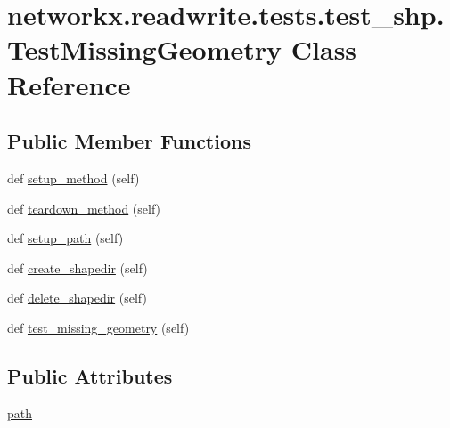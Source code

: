 \hypertarget{classnetworkx_1_1readwrite_1_1tests_1_1test__shp_1_1TestMissingGeometry}{}\section{networkx.\+readwrite.\+tests.\+test\+\_\+shp.\+Test\+Missing\+Geometry Class Reference}
\label{classnetworkx_1_1readwrite_1_1tests_1_1test__shp_1_1TestMissingGeometry}
\subsection*{Public Member Functions}
\begin{DoxyCompactItemize}
\item 
def \hyperlink{classnetworkx_1_1readwrite_1_1tests_1_1test__shp_1_1TestMissingGeometry_a81fc3ef8faa1e1f95e22326369904e1c}{setup\+\_\+method} (self)
\item 
def \hyperlink{classnetworkx_1_1readwrite_1_1tests_1_1test__shp_1_1TestMissingGeometry_a54a746469c3c0dc5aed4b16d786c9879}{teardown\+\_\+method} (self)
\item 
def \hyperlink{classnetworkx_1_1readwrite_1_1tests_1_1test__shp_1_1TestMissingGeometry_aafee930daa908456406e1d12b9e31465}{setup\+\_\+path} (self)
\item 
def \hyperlink{classnetworkx_1_1readwrite_1_1tests_1_1test__shp_1_1TestMissingGeometry_a21e7a246e8a58e5655a68eb42ccc12f5}{create\+\_\+shapedir} (self)
\item 
def \hyperlink{classnetworkx_1_1readwrite_1_1tests_1_1test__shp_1_1TestMissingGeometry_abee872ea0f6b1f8d8e2c74c835fc5b9f}{delete\+\_\+shapedir} (self)
\item 
def \hyperlink{classnetworkx_1_1readwrite_1_1tests_1_1test__shp_1_1TestMissingGeometry_a1c1eb6fa964c0cb7df52d60e98600a7b}{test\+\_\+missing\+\_\+geometry} (self)
\end{DoxyCompactItemize}
\subsection*{Public Attributes}
\begin{DoxyCompactItemize}
\item 
\hyperlink{classnetworkx_1_1readwrite_1_1tests_1_1test__shp_1_1TestMissingGeometry_a4fe5bf3b10192a3d1ce602681df917d3}{path}
\end{DoxyCompactItemize}


